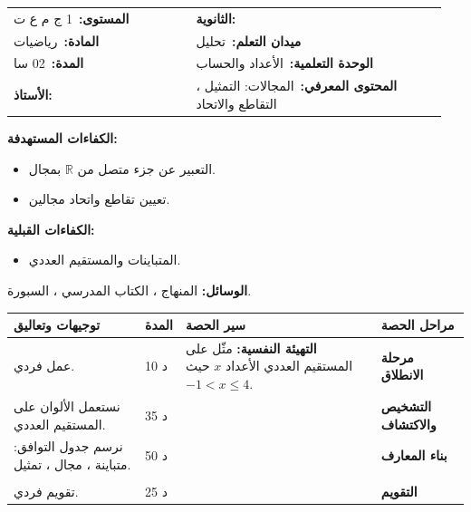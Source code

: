 \documentclass[12pt,a4paper]{article}
\makeatletter
\newenvironment{LTR}{\begin{otherlanguage}{english}}{\end{otherlanguage}}
\newcommand{\ar}[1]{\foreignlanguage{arabic}{#1}}
\newcommand{\R}{\mathbb{R}}
\newcommand{\Phase}[1]{\textbf{#1}}
\newcommand{\Fld}[2]{\textbf{#1:}\ #2}
\newcommand{\ModhHead}[9]{%
\begin{LTR}
\begin{tcolorbox}[enhanced,colback=white,colframe=cThm!85!black,arc=4mm,boxrule=1pt,top=14pt,bottom=6pt,left=8pt,right=8pt,
 overlay={\node[fill=cThm!85!black,text=white,rounded corners=3mm,inner xsep=14pt,inner ysep=4pt,font=\large\bfseries] at ([yshift=0pt]frame.north){\ar{مذكرة رقم #1}};},
 before upper={\selectlanguage{arabic}}]
\begin{tabular}{@{}p{0.4\linewidth}p{0.55\linewidth}@{}}
\Fld{المستوى}{#2} & \Fld{الثانوية}{\dotfill}\\[3pt]
\Fld{المادة}{رياضيات} & \Fld{ميدان التعلم}{#3}\\[3pt]
\Fld{المدة}{#5} & \Fld{الوحدة التعلمية}{#4}\\[3pt]
\Fld{الأستاذ}{\dotfill} & \Fld{المحتوى المعرفي}{#6}\\
\end{tabular}
\end{tcolorbox}
\begin{tcolorbox}[enhanced,colback=white,colframe=cThm!85!black,arc=3mm,boxrule=0.8pt,sidebyside,sidebyside align=top,lefthand ratio=0.5,
 segmentation style={dashed,cThm!60},before upper={\selectlanguage{arabic}},before lower={\selectlanguage{arabic}}]
\textbf{الكفاءات المستهدفة:}\par #8
\tcblower
\textbf{الكفاءات القبلية:}\par #7
\end{tcolorbox}
\end{LTR}
\par\smallskip\textbf{الوسائل:} #9\par\smallskip}
\newenvironment{Sayr}{%
\begin{LTR}\renewcommand{\arraystretch}{1.25}
\begin{longtable}{|p{0.17\textwidth}|>{\centering\arraybackslash}p{0.06\textwidth}|p{0.53\textwidth}|>{\centering\arraybackslash}p{0.12\textwidth}|}
\hline\rowcolor{cThm!12}\ar{\textbf{توجيهات وتعاليق}} & \ar{\textbf{المدة}} & \ar{\textbf{سير الحصة}} & \ar{\textbf{مراحل الحصة}}\\\hline\endhead
\hline\endfoot}{\end{longtable}\end{LTR}}
\newcommand{\Row}[4]{\ar{\small #4} & \ar{#3} & \ar{#2} & \cellcolor{cThm!8}\ar{\Phase{#1}}\\\hline}
\newcommand{\Lab}[2]{\foreignlanguage{english}{\tcbox[on line,colback=#1,colframe=#1,boxrule=0pt,arc=2pt,boxsep=1pt,left=5pt,right=5pt,top=1pt,bottom=1pt]{\ar{\textcolor{white}{\textbf{#2}}}}}}
\newcommand{\ck}{\ensuremath{{\color{cRem}\checkmark}}}
\makeatother
\begin{document}
\newpage
\ModhHead{09}{1 ج م ع ت}{تحليل}{الأعداد والحساب}{02 سا}{المجالات: التمثيل ، التقاطع والاتحاد}%
{\begin{itemize}\item المتباينات والمستقيم العددي.\end{itemize}}%
{\begin{itemize}\item التعبير عن جزء متصل من $\R$ بمجال.\item تعيين تقاطع واتحاد مجالين.\end{itemize}}%
{المنهاج ، الكتاب المدرسي ، السبورة.}
\begin{Sayr}
\Row{مرحلة الانطلاق}{%
\textbf{التهيئة النفسية:} مثّل على المستقيم العددي الأعداد $x$ حيث $-1<x\leqslant4$.}{10 د}{عمل فردي.}
\Row{التشخيص والاكتشاف}{%
\Lab{cEx}{وضعية مقترحة}\par مثّل على نفس المستقيم: $A$: $-2\leqslant x\leqslant3$ و $B$: $1<x\leqslant5$ ، ثم لوّن الأعداد المشتركة ، ثم الأعداد التي تنتمي إلى أحدهما على الأقل.\par\ck\ المشترك: $]1;3]$ ؛ أحدهما على الأقل: $[-2;5]$.\par
}{35 د}{نستعمل الألوان على المستقيم العددي.}
\Row{بناء المعارف}{%
\Lab{cDef}{تعريف}\par\ck\ المجالات المحدودة: $[a;b]$ ، $]a;b[$ ، $[a;b[$ ، $]a;b]$.\par
\ck\ غير المحدودة: $[a;+\infty[$ ، $]a;+\infty[$ ، $]-\infty;b]$ ، $]-\infty;b[$ ، و $\R=]-\infty;+\infty[$.\par
\Lab{cDef}{التقاطع والاتحاد}\ $I\cap J$: الأعداد التي تنتمي إلى $I$ \textbf{و} $J$ ؛ $I\cup J$: التي تنتمي إلى $I$ \textbf{أو} $J$.\par}{50 د}{نرسم جدول التوافق: متباينة ، مجال ، تمثيل.}
\Row{}{%
\Lab{cEx}{مثال}\ $[-2;3]\cap]1;5]=]1;3]$ ؛ $[-2;3]\cup]1;5]=[-2;5]$ ؛ $]-\infty;1[\cap[4;+\infty[=\varnothing$.\par\Lab{cThm!80!black}{حذار}\ الرمز $\infty$ ليس عدداً ، فالقوس عنده مفتوح دائماً.}{}{}
\Row{التقويم}{%
\Lab{cEx}{تطبيق}\par اكتب بمجال: $-1<x\leqslant4$ ؛ $x\geqslant2$. عيّن $]-3;2]\cap[0;5[$ و $]-3;2]\cup[0;5[$.\par\textbf{الحل:} $]-1;4]$ ؛ $[2;+\infty[$ ؛ $[0;2]$ ؛ $]-3;5[$.\par\textbf{واجب منزلي:} تمارين من الكتاب المدرسي.\par\smallskip\textbf{ملاحظات حول سير الحصة:} \dotfill}{25 د}{تقويم فردي.}
\end{Sayr}
\newpage
{}%
\end{document}
